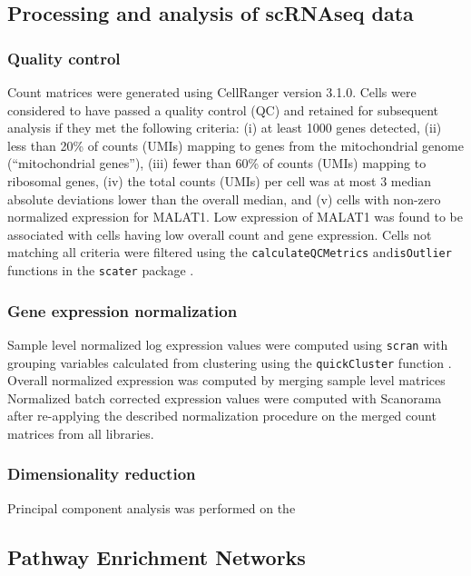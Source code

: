 \documentclass{article}
\begin{document}
\subsection{Processing and analysis of scRNAseq data }

\subsubsection{Quality control}

Count matrices were generated using CellRanger version 3.1.0. Cells were considered to have passed a quality control (QC) and retained for subsequent analysis if they met the following criteria: (i) at least 1000 genes detected, (ii) less than 20\% of counts (UMIs) mapping to genes from the mitochondrial genome (``mitochondrial genes''), (iii) fewer than 60\% of counts (UMIs) mapping to ribosomal genes, (iv) the total counts (UMIs) per cell was at most 3 median absolute deviations lower than the overall median, and (v) cells with non-zero normalized expression for MALAT1. Low expression of MALAT1 was found to be associated with cells having low overall count and gene expression.  Cells not matching all criteria were filtered using the \texttt{calculateQCMetrics} and\texttt{isOutlier} functions in the \texttt{scater} package \cite{mccarthy2017scater}. 

\subsubsection{Gene expression normalization}

Sample level normalized log expression values were computed using \texttt{scran} \cite{lun2016pooling} with grouping variables calculated from clustering using the \texttt{quickCluster} function \cite{lun2016step}. Overall normalized expression was computed by merging sample level matrices
Normalized batch corrected expression values were computed with Scanorama \cite{hie2019efficient} after re-applying the described normalization procedure on the merged count matrices from all libraries.

\subsubsection{Dimensionality reduction}

Principal component analysis was performed on the 


\subsection{Pathway Enrichment Networks}
\end{document}
